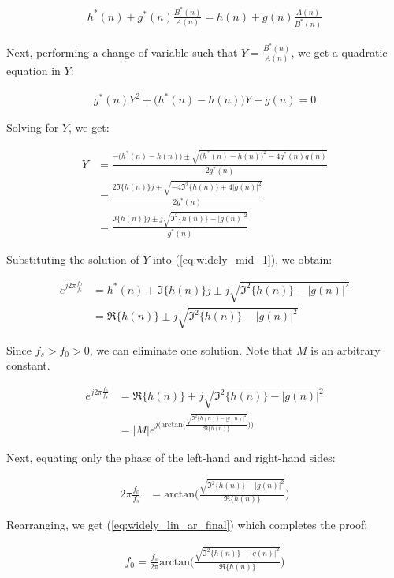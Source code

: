 \begin{align*}
h^*(n) + g^*(n)\frac{B^*(n)}{A(n)} = h(n) + g(n)\frac{A(n)}{B^*(n)} 
\end{align*}

\noindent{}Next, performing a change of variable such that $Y=\frac{B^*(n)}{A(n)}$, we get a quadratic equation in $Y$:

\begin{align*}
g^*(n)Y^2 + \big(h^*(n)-h(n)\big)Y + g(n) = 0
\end{align*}

\noindent{}Solving for $Y$, we get:

\begin{align*}
Y &= \frac{-\big(h^*(n)-h(n)\big) \pm \sqrt{\big(h^*(n)-h(n)\big)^2-4g^*(n)g(n)}}{2g^*(n)} \\
&= \frac{2\Im\{h(n)\}j \pm \sqrt{-4\Im^2\{h(n)\}+4|g(n)|^2}}{2g^*(n)} \\
&= \frac{\Im\{h(n)\}j \pm j\sqrt{\Im^2\{h(n)\}-|g(n)|^2}}{g^*(n)}
\end{align*}

\noindent{}Substituting the solution of $Y$ into (\ref{eq:widely_mid_1}), we obtain:

\begin{align*}
e^{j2\pi\frac{f_0}{f_s}} &= h^*(n) + \Im\{h(n)\}j \pm j\sqrt{\Im^2\{h(n)\}-|g(n)|^2} \\
&= \Re\{h(n)\} \pm j\sqrt{\Im^2\{h(n)\}-|g(n)|^2}
\end{align*}

\noindent{}Since $f_s > f_0 > 0$, we can eliminate one solution. Note that $M$ is an arbitrary constant.

\begin{align*}
e^{j2\pi\frac{f_0}{f_s}}  &= \Re\{h(n)\} + j\sqrt{\Im^2\{h(n)\}-|g(n)|^2} \\
&= |M| e^{j\big(\text{arctan}\big(\frac{\sqrt{\Im^2\{h(n)\}-|g(n)|^2}}{\Re\{h(n)\}}\big)\big)}
\end{align*}

\noindent{}Next, equating only the phase of the left-hand and right-hand sides:

\begin{align*}
2\pi\frac{f_0}{f_s}  &= \text{arctan}\bigg(\frac{\sqrt{\Im^2\{h(n)\}-|g(n)|^2}}{\Re\{h(n)\}}\bigg)
\end{align*}

\noindent{}Rearranging, we get (\ref{eq:widely_lin_ar_final}) which completes the proof:

\begin{align}
f_0 = \frac{f_s}{2\pi} \text{arctan}\bigg(\frac{\sqrt{\Im^2\{h(n)\}-|g(n)|^2}}{\Re\{h(n)\}}\bigg) \label{eq:widely_lin_ar_final}
\end{align}

